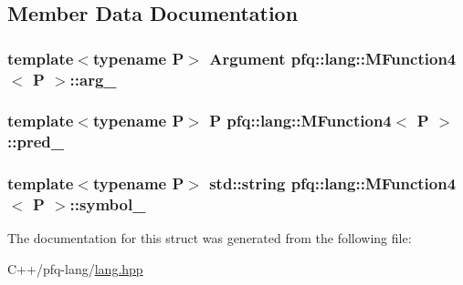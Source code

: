 \subsection{Member Data Documentation}
\hypertarget{structpfq_1_1lang_1_1MFunction4_a0c8869c04320155c823b170238fe3328}{
\subsubsection[{arg\+\_\+}]{\setlength{\rightskip}{0pt plus 5cm}template$<$typename P$>$ {\bf Argument} {\bf pfq\+::lang\+::\+M\+Function4}$<$ P $>$\+::arg\+\_\+}}\label{structpfq_1_1lang_1_1MFunction4_a0c8869c04320155c823b170238fe3328}
\hypertarget{structpfq_1_1lang_1_1MFunction4_afab1d0698ee0f15d8b68a04758d95420}{
\subsubsection[{pred\+\_\+}]{\setlength{\rightskip}{0pt plus 5cm}template$<$typename P$>$ P {\bf pfq\+::lang\+::\+M\+Function4}$<$ P $>$\+::pred\+\_\+}}\label{structpfq_1_1lang_1_1MFunction4_afab1d0698ee0f15d8b68a04758d95420}
\hypertarget{structpfq_1_1lang_1_1MFunction4_a378305b806200784b8edbb3511cc0ea9}{
\subsubsection[{symbol\+\_\+}]{\setlength{\rightskip}{0pt plus 5cm}template$<$typename P$>$ std\+::string {\bf pfq\+::lang\+::\+M\+Function4}$<$ P $>$\+::symbol\+\_\+}}\label{structpfq_1_1lang_1_1MFunction4_a378305b806200784b8edbb3511cc0ea9}


The documentation for this struct was generated from the following file\+:\begin{DoxyCompactItemize}
\item 
C++/pfq-\/lang/\hyperlink{lang_8hpp}{lang.\+hpp}\end{DoxyCompactItemize}
